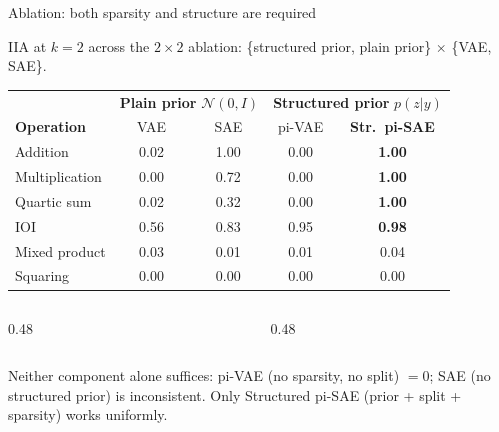 \documentclass[aspectratio=169,11pt]{beamer}
\begin{document}
\begin{frame}{Ablation: both sparsity and structure are required}
\vspace{-0.2em}
\centering

{\small IIA at $k{=}2$ across the $2 \times 2$ ablation: \{structured prior, plain prior\} $\times$ \{VAE, SAE\}.}

\vspace{0.5em}
{\setlength{\tabcolsep}{4pt}
\begin{tabular}{@{}l|cc|cc@{}}
\toprule
& \multicolumn{2}{c|}{\textbf{Plain prior} $\mathcal{N}(0,I)$} & \multicolumn{2}{c}{\textbf{Structured prior} $p(z|y)$} \\
\textbf{Operation} & VAE & SAE & pi-VAE & \textbf{Str.\ pi-SAE} \\
\midrule
Addition & 0.02 & \textcolor{always}{1.00} & 0.00 & \textbf{\textcolor{always}{1.00}} \\
Multiplication & 0.00 & 0.72 & 0.00 & \textbf{\textcolor{always}{1.00}} \\
Quartic sum & 0.02 & 0.32 & 0.00 & \textbf{\textcolor{always}{1.00}} \\
IOI & 0.56 & 0.83 & \textcolor{always}{0.95} & \textbf{\textcolor{always}{0.98}} \\
\midrule
Mixed product & 0.03 & 0.01 & 0.01 & 0.04 \\
Squaring & 0.00 & 0.00 & 0.00 & 0.00 \\
\bottomrule
\end{tabular}}

\vspace{0.5em}
\begin{columns}[T]
\begin{column}{0.48\textwidth}
\end{column}
\begin{column}{0.48\textwidth}
\end{column}
\end{columns}

\vspace{0.3em}
\centering
{\small Neither component alone suffices: pi-VAE (no sparsity, no split) $= 0$; SAE (no structured prior) is inconsistent. Only Structured pi-SAE (prior + split + sparsity) works uniformly.}
\end{frame}
\end{document}
